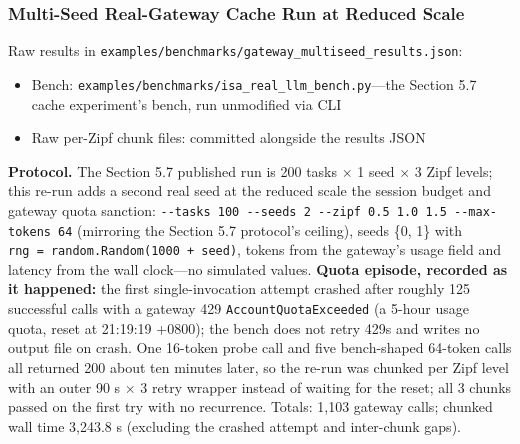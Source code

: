 \documentclass[
  11pt,
]{article}
\providecommand{\tightlist}{%
  \setlength{\itemsep}{0pt}\setlength{\parskip}{0pt}}
\begin{document}
\subsubsection{Multi-Seed Real-Gateway Cache Run at Reduced
Scale}\label{multi-seed-real-gateway-cache-run-at-reduced-scale}

Raw results in
\texttt{examples/benchmarks/gateway\_multiseed\_results.json}:

\begin{itemize}
\tightlist
\item
  Bench: \texttt{examples/benchmarks/isa\_real\_llm\_bench.py}---the
  Section 5.7 cache experiment's bench, run unmodified via CLI
\item
  Raw per-Zipf chunk files: committed alongside the results JSON
\end{itemize}

\textbf{Protocol.} The Section 5.7 published run is 200 tasks \(\times\)
1 seed \(\times\) 3 Zipf levels; this re-run adds a second real seed at
the reduced scale the session budget and gateway quota sanction:
\texttt{-\/-tasks\ 100\ -\/-seeds\ 2\ -\/-zipf\ 0.5\ 1.0\ 1.5\ -\/-max-tokens\ 64}
(mirroring the Section 5.7 protocol's ceiling), seeds \{0, 1\} with
\texttt{rng\ =\ random.Random(1000\ +\ seed)}, tokens from the gateway's
usage field and latency from the wall clock---no simulated values.
\textbf{Quota episode, recorded as it happened:} the first
single-invocation attempt crashed after roughly 125 successful calls
with a gateway 429 \texttt{AccountQuotaExceeded} (a 5-hour usage quota,
reset at 21:19:19 +0800); the bench does not retry 429s and writes no
output file on crash. One 16-token probe call and five bench-shaped
64-token calls all returned 200 about ten minutes later, so the re-run
was chunked per Zipf level with an outer 90 s \(\times\) 3 retry wrapper
instead of waiting for the reset; all 3 chunks passed on the first try
with no recurrence. Totals: 1,103 gateway calls; chunked wall time
3,243.8 s (excluding the crashed attempt and inter-chunk gaps).
\end{document}
